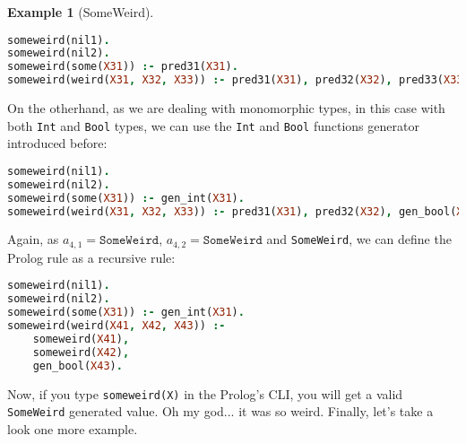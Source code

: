 \documentclass{report}
\theoremstyle{definition}
\newtheorem{example}{Example}[section]
\theoremstyle{definition}
\newcommand{\ttt}[1]{\texttt{#1}}
\begin{document}
\begin{example}[SomeWeird]
\begin{lstlisting}[language=Prolog]
someweird(nil1).																														%% rule 1
someweird(nil2).																														%% rule 2
someweird(some(X31)) :- pred31(X31).																				%% rule 3
someweird(weird(X31, X32, X33)) :- pred31(X31), pred32(X32), pred33(X33).		%% rule 4
\end{lstlisting}
On the otherhand, as we are dealing with monomorphic types, in this case with both \ttt{Int} and \ttt{Bool} types, we can use the \ttt{Int} and \ttt{Bool} functions generator introduced before:\\
\begin{lstlisting}[language=Prolog]
someweird(nil1).																														%% rule 1
someweird(nil2).																														%% rule 2
someweird(some(X31)) :- gen_int(X31).																				%% rule 3
someweird(weird(X31, X32, X33)) :- pred31(X31), pred32(X32), gen_bool(X33).	%% rule 4
\end{lstlisting}
Again, as $a_{4,1} = \ttt{SomeWeird}$, $a_{4,2} = \ttt{SomeWeird}$ and \ttt{SomeWeird}, we can define the Prolog rule as a recursive rule:\\
\begin{lstlisting}[language=Prolog]
someweird(nil1).																														%% rule 1
someweird(nil2).																														%% rule 2
someweird(some(X31)) :- gen_int(X31).																				%% rule 3
someweird(weird(X41, X42, X43)) :-																					%% rule 4
	someweird(X41),
	someweird(X42),
	gen_bool(X43).
\end{lstlisting}
Now, if you type \ttt{someweird(X)} in the Prolog's CLI, you will get a valid \ttt{SomeWeird} generated value. Oh my god... it was so weird. Finally, let's take a look one more example.
\end{example}
\end{document}
